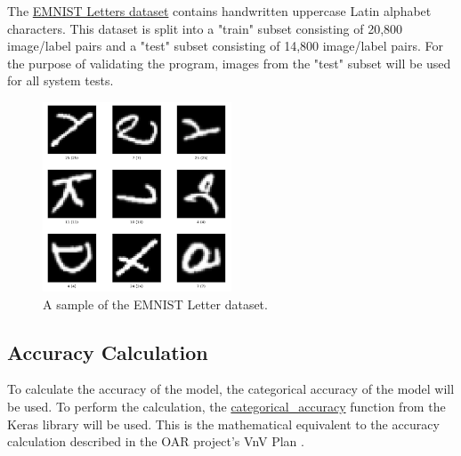 \documentclass[12pt, titlepage]{article}
\begin{document}
The \href{https://www.tensorflow.org/datasets/catalog/emnist#emnistletters}{EMNIST Letters dataset} contains handwritten uppercase Latin alphabet
characters. This dataset is split into a "train" subset consisting of 20,800
image/label pairs and a "test" subset consisting of 14,800 image/label pairs.
For the purpose of validating the \progname{} program, images from the "test"
subset will be used for all system tests.

\begin{figure}[H]
\centering
\includegraphics[width=0.5\textwidth]{emnist_letters.png}
\caption{A sample of the EMNIST Letter dataset.}
\label{FigUH}
\end{figure}

\subsection{Accuracy Calculation}
\label{sec:AccuracyCalculation}
To calculate the accuracy of the model, the categorical accuracy of the
model will be used. To perform the calculation, the \href{https://github.com/keras-team/keras/blob/c2e36f369b411ad1d0a40ac096fe35f73b9dffd3/keras/metrics.py}{categorical\_accuracy} function
from the Keras library will be used. This is the mathematical equivalent to the
accuracy calculation described in the OAR project's VnV Plan \citep{OARVnVPlan}.




\end{document}
